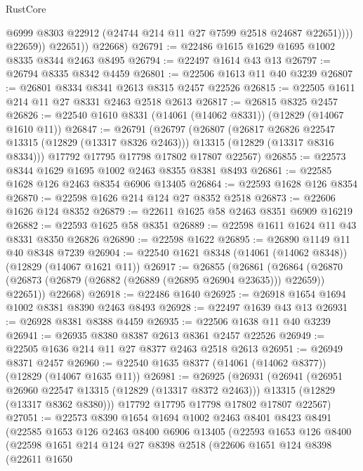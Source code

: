 \begin{lexlean}{RustCore}
\begin{coremodule}
                    @6999
                    @8303
                    @22912
                    (@24744 @214 @11 @27 @7599 @2518 @24687 @22651))))
              @22659))
          @22651))
      @22668)
@26791 := @22486 @1615 @1629 @1695 @1002 @8335 @8344 @2463 @8495
@26794 := @22497 @1614 @43 @13
@26797 := @26794 @8335 @8342 @4459
@26801 := @22506 @1613 @11 @40 @3239
@26807 := @26801 @8334 @8341 @2613 @8315 @2457 @22526
@26815 := @22505 @1611 @214 @11 @27 @8331 @2463 @2518 @2613
@26817 := @26815 @8325 @2457
@26826 := @22540 @1610 @8331 (@14061 (@14062 @8331)) (@12829 (@14067 @1610 @11))
@26847 := @26791
    (@26797
      (@26807
        (@26817 @26826 @22547 @13315 (@12829 (@13317 @8326 @2463)))
        @13315
        (@12829 (@13317 @8316 @8334)))
      @17792
      @17795
      @17798
      @17802
      @17807
      @22567)
@26855 := @22573 @8344 @1629 @1695 @1002 @2463 @8355 @8381 @8493
@26861 := @22585 @1628 @126 @2463 @8354 @6906 @13405
@26864 := @22593 @1628 @126 @8354
@26870 := @22598 @1626 @214 @124 @27 @8352 @2518
@26873 := @22606 @1626 @124 @8352
@26879 := @22611 @1625 @58 @2463 @8351 @6909 @16219
@26882 := @22593 @1625 @58 @8351
@26889 := @22598 @1611 @1624 @11 @43 @8331 @8350 @26826
@26890 := @22598 @1622
@26895 := @26890 @1149 @11 @40 @8348 @7239
@26904 := @22540 @1621 @8348 (@14061 (@14062 @8348)) (@12829 (@14067 @1621 @11))
@26917 := @26855
    (@26861
      (@26864 (@26870 (@26873 (@26879 (@26882 (@26889 (@26895 @26904 @23635))) @22659)) @22651))
      @22668)
@26918 := @22486 @1640
@26925 := @26918 @1654 @1694 @1002 @8381 @8390 @2463 @8493
@26928 := @22497 @1639 @43 @13
@26931 := @26928 @8381 @8388 @4459
@26935 := @22506 @1638 @11 @40 @3239
@26941 := @26935 @8380 @8387 @2613 @8361 @2457 @22526
@26949 := @22505 @1636 @214 @11 @27 @8377 @2463 @2518 @2613
@26951 := @26949 @8371 @2457
@26960 := @22540 @1635 @8377 (@14061 (@14062 @8377)) (@12829 (@14067 @1635 @11))
@26981 := @26925
    (@26931
      (@26941
        (@26951 @26960 @22547 @13315 (@12829 (@13317 @8372 @2463)))
        @13315
        (@12829 (@13317 @8362 @8380)))
      @17792
      @17795
      @17798
      @17802
      @17807
      @22567)
@27051 := @22573
    @8390
    @1654
    @1694
    @1002
    @2463
    @8401
    @8423
    @8491
    (@22585
      @1653
      @126
      @2463
      @8400
      @6906
      @13405
      (@22593
        @1653
        @126
        @8400
        (@22598
          @1651
          @214
          @124
          @27
          @8398
          @2518
          (@22606
            @1651
            @124
            @8398
            (@22611
              @1650

\end{coremodule}
\end{lexlean}
